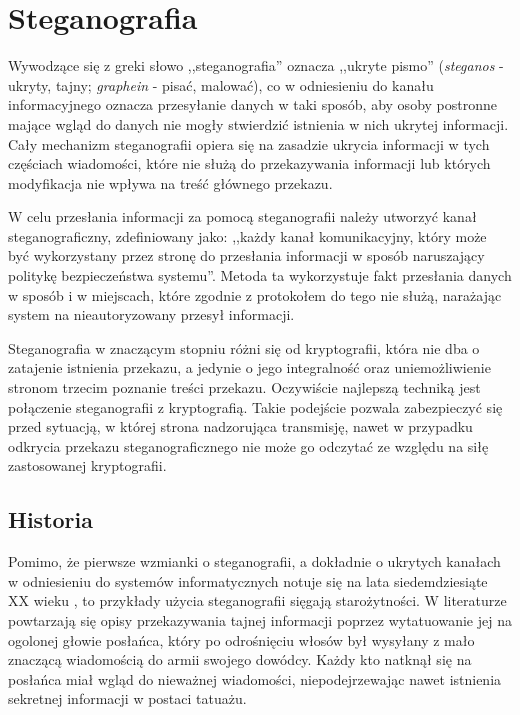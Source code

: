 \documentclass[a4paper,12pt,twoside,openany]{report}
\begin{document}
\chapter{Steganografia}
Wywodzące się z greki słowo ,,steganografia'' oznacza ,,ukryte pismo'' (\textit{steganos} - ukryty, tajny; \textit{graphein} - pisać, malować), co w odniesieniu do kanału informacyjnego oznacza przesyłanie danych w taki sposób, aby osoby postronne mające wgląd do danych nie mogły stwierdzić istnienia w nich ukrytej informacji. Cały mechanizm steganografii opiera się na zasadzie ukrycia informacji w tych częściach wiadomości, które nie służą do przekazywania informacji lub których modyfikacja nie wpływa na treść głównego przekazu.

W celu przesłania informacji za pomocą steganografii należy utworzyć kanał steganograficzny, zdefiniowany \cite{USDoD}  jako: ,,każdy kanał komunikacyjny, który może być wykorzystany przez stronę do przesłania informacji w sposób naruszający politykę bezpieczeństwa systemu''. Metoda ta wykorzystuje fakt przesłania danych w sposób i w miejscach, które zgodnie z protokołem do tego nie służą, narażając system na nieautoryzowany przesył informacji.

Steganografia w znaczącym stopniu różni się od kryptografii, która nie dba o zatajenie istnienia przekazu, a jedynie o jego integralność oraz uniemożliwienie stronom trzecim poznanie treści przekazu. Oczywiście najlepszą techniką jest połączenie steganografii z kryptografią. Takie podejście pozwala zabezpieczyć się przed sytuacją, w której strona nadzorująca transmisję, nawet w przypadku odkrycia przekazu steganograficznego nie może go odczytać ze względu na siłę zastosowanej kryptografii.
\section{Historia}
Pomimo, że pierwsze wzmianki o steganografii, a dokładnie o ukrytych kanałach w odniesieniu do systemów informatycznych notuje się na lata siedemdziesiąte XX wieku \cite{FirstCC}, to przykłady użycia steganografii sięgają starożytności. W literaturze powtarzają się opisy przekazywania tajnej informacji poprzez wytatuowanie jej na ogolonej głowie posłańca, który po odrośnięciu włosów był wysyłany z mało znaczącą wiadomością do armii swojego dowódcy. Każdy kto natknął się na posłańca miał wgląd do nieważnej wiadomości, niepodejrzewając nawet istnienia sekretnej informacji w postaci tatuażu.
\end{document}
